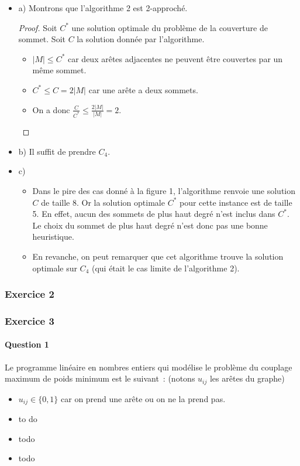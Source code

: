 \documentclass[a4paper, 12pt]{article}
\begin{document}
\begin{itemize}
\item[] a) Montrons que l'algorithme 2 est 2-approché.
\begin{proof}
Soit $C^{*}$ une solution optimale du problème de la couverture de
sommet. Soit $C$ la solution donnée par l'algorithme. 
\begin{itemize}
\item[] $|M| \leq C^{*}$ car deux arêtes adjacentes ne peuvent être
  couvertes par un même sommet.
\item[] $C^{*} \leq C = 2 |M|$ car une arête a deux sommets.
\item[] On a donc $\frac{C}{C^{*}} \leq \frac{2|M|}{|M|} = 2$.
\end{itemize}
\end{proof}
\item[] b) Il suffit de prendre $C_4$.
\item[] c) 
\begin{itemize}
\item[] Dans le pire des cas donné à la figure 1, l'algorithme renvoie
  une solution $C$ de taille 8. Or la solution optimale $C^*$ pour cette
  instance est de taille 5. En effet, aucun des sommets de plus haut
  degré n'est inclus dans $C^{*}$. Le choix du sommet de plus haut
  degré n'est donc pas une bonne heuristique. 
\item[] En revanche, on peut remarquer que cet algorithme trouve la
  solution optimale sur $C_4$ (qui était le cas limite de l'algorithme 2).
\end{itemize}
\end{itemize}

\subsubsection*{Exercice 2}

\subsubsection*{Exercice 3}

\paragraph{Question 1}Le programme linéaire en nombres entiers qui modélise le
  problème du couplage maximum de poids minimum est le suivant~:
  (notons $u_{ij}$ les arêtes du graphe)
\begin{itemize}
\item $u_{ij} \in \{0, 1\}$ car on prend une arête ou on ne la prend pas.
\item to do
\item todo
\item todo
\end{itemize}
\end{document}
